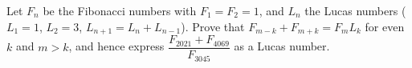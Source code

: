 Let $F_n$ be the Fibonacci numbers with $F_1=F_2=1$, and $L_n$ the Lucas numbers ($L_1=1$, $L_2=3$, $L_{n+1}=L_n+L_{n-1}$). Prove that $F_{m-k}+F_{m+k}=F_mL_k$ for even $k$ and $m>k$, and hence express $\dfrac{F_{2021}+F_{4069}}{F_{3045}}$ as a Lucas number.
